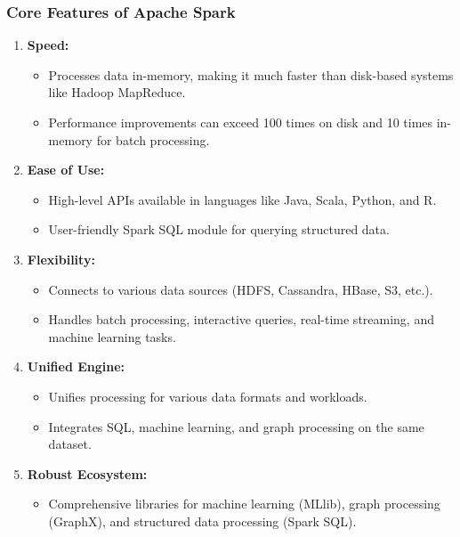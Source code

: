 \documentclass[aspectratio=169]{beamer}
\begin{document}
\begin{frame}[fragile]
    \frametitle{Core Features of Apache Spark}
    \begin{enumerate}
        \item \textbf{Speed:}
        \begin{itemize}
            \item Processes data in-memory, making it much faster than disk-based systems like Hadoop MapReduce.
            \item Performance improvements can exceed 100 times on disk and 10 times in-memory for batch processing.
        \end{itemize}
        
        \item \textbf{Ease of Use:}
        \begin{itemize}
            \item High-level APIs available in languages like Java, Scala, Python, and R.
            \item User-friendly Spark SQL module for querying structured data.
        \end{itemize}
        
        \item \textbf{Flexibility:}
        \begin{itemize}
            \item Connects to various data sources (HDFS, Cassandra, HBase, S3, etc.).
            \item Handles batch processing, interactive queries, real-time streaming, and machine learning tasks.
        \end{itemize}
        
        \item \textbf{Unified Engine:}
        \begin{itemize}
            \item Unifies processing for various data formats and workloads.
            \item Integrates SQL, machine learning, and graph processing on the same dataset.
        \end{itemize}
        
        \item \textbf{Robust Ecosystem:}
        \begin{itemize}
            \item Comprehensive libraries for machine learning (MLlib), graph processing (GraphX), and structured data processing (Spark SQL).
        \end{itemize}
    \end{enumerate}
\end{frame}
\end{document}
